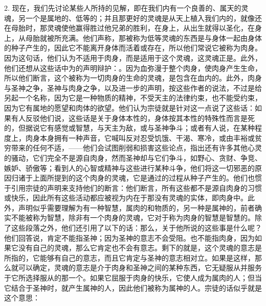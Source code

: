 2. 现在，我们先讨论某些人所持的见解，即在我们内有一个良善的、属天的灵魂，另一个是属地的、低等的；并且那更好的灵魂是从天上植入我们内的，就像还在母胎时，那灵魂使他赢得胜过他兄弟的胜利，在身上，从出生就得以圣化，在身上，从母胎就被所充满。他们声称，那被称为低等灵魂的东西是与身体一起由身体的种子产生的，因此它不能离开身体而活着或存在，所以他们常说它被称为肉身。因为这句话，他们认为不适用于肉身，而是适用于这个灵魂，这灵魂正是。此外，他们还想从这些话中为的声明辩护：。因为血弥漫于整个肉身，使肉身产生生命，所以他们断言，这个被称为一切肉身的生命的灵魂，是包含在血内的。此外，肉身与圣神之争，圣神与肉身之争，以及进一步的声明，按这些作者的说法，不过是给另起一个名称，因为它是一种物质的精神，不受天主的法律约束，也不能受约束，因为它有属地的愿望和肉体的欲望。他们认为宗徒就是针对这一点说了这些话：如果有人反驳他们说，这些话是关于身体本性的，身体按其本性的特殊性而言是死的，但据说它有感觉或智慧，与天主为敌，或与圣神争斗；或者有人说，在某种程度上，肉身本身拥有一种声音，它喊叫反对忍受饥饿、干渴、寒冷，或由丰裕或贫穷带来的任何不适，——他们会试图削弱和损害这些论点，指出还有许多其他心灵的骚动，它们完全不是源自肉身，然而圣神却与它们争斗，如野心、贪财、争竞、嫉妒、骄傲等；看到人的心智或精神与这些进行某种斗争，他们将这一切邪恶的原因归诸于上面所提到的这个肉身的灵魂，它是通过的过程从种子产生的。他们也惯于引用宗徒的声明来支持他们的断言：他们断言，所有这些都不是源自肉身的习惯或快乐，因此所有这些活动都应被视为内在于那没有灵魂的实体，即肉身中。此外，声明似乎需要理解为有一种智慧，属肉的和物质的，另一种是属神的，前者确实不能被称为智慧，除非有一个肉身的灵魂，它对于称为肉身的智慧是智慧的。除了这些段落之外，他们还引用了以下的话：那么，关于他所说的这些事是什么呢？他们回答说，肯定不能指圣神；因为圣神的意志不会受阻。也不能指肉身，因为如果它没有自己的灵魂，那么它肯定也不会有意志。剩下的就是，这个灵魂的意志是所指的，它能够有自己的意志，而且它肯定与圣神的意志相对立。如果是这样，那么就可以确定，灵魂的意志是介于肉身和圣神之间的某种东西，它无疑服从并服务于它所选择服从的那一个。如果它屈服于肉身的快乐，它使人成为属肉的人；但当它结合于圣神时，就产生属神的人，因此他们被称为属神的人。宗徒的话似乎就是这个意思：\par

